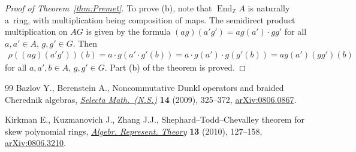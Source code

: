 \documentclass[11pt]{article}
\DeclareMathOperator{\End}{End}
\begin{document}
\begin{proof}[Proof of Theorem~\ref{thm:Premet}]
To prove (b), note that $\End_\mathbb Z A$ is naturally a~ring, with multiplication being composition of maps.
The semidirect product multiplication on $A G$ is given by the formula $(ag)(a'g')=ag(a')\cdot gg'$ for all $a,a'\in A$,
$g,g'\in G$.
Then
\begin{gather*}
\rho((ag)(a'g'))(b)=a\cdot g(a'\cdot g'(b))=a\cdot g(a')\cdot g(g'(b)) = ag(a') (gg')(b)
\end{gather*}
for all $a,a',b\in A$, $g,g'\in G$.
Part (b) of the theorem is proved.
\end{proof}
\begin{thebibliography}{99}
Bazlov Y., Berenstein A., Noncommutative {D}unkl operators and braided
  {C}herednik algebras, \href{http://dx.doi.org/10.1007/s00029-009-0525-x}{\textit{Selecta Math.~(N.S.)}} \textbf{14} (2009),
  325--372, \href{http://arxiv.org/abs/0806.0867}{arXiv:0806.0867}.

Kirkman E., Kuzmanovich J., Zhang J.J., Shephard--{T}odd--{C}hevalley theorem
  for skew polynomial rings, \href{http://dx.doi.org/10.1007/s10468-008-9109-2}{\textit{Algebr. Represent. Theory}} \textbf{13}
  (2010), 127--158, \href{http://arxiv.org/abs/0806.3210}{arXiv:0806.3210}.

\end{thebibliography}
\end{document}
